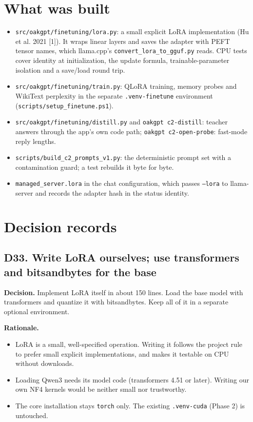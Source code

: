 \documentclass[11pt,a4paper]{article}
\newcommand{\code}[1]{\texttt{#1}}
\begin{document}
\section{What was built}

\begin{itemize}
\item \code{src/oakgpt/finetuning/lora.py}: a small explicit LoRA implementation (Hu et al. 2021 [1]). It wraps linear layers and saves the adapter with PEFT tensor names, which llama.cpp's \code{convert\_lora\_to\_gguf.py} reads. CPU tests cover identity at initialization, the update formula, trainable-parameter isolation and a save/load round trip.
\item \code{src/oakgpt/finetuning/train.py}: QLoRA training, memory probes and WikiText perplexity in the separate \code{.venv-finetune} environment (\code{scripts/setup\_finetune.ps1}).
\item \code{src/oakgpt/finetuning/distill.py} and \code{oakgpt c2-distill}: teacher answers through the app's own code path; \code{oakgpt c2-open-probe}: fast-mode reply lengths.
\item \code{scripts/build\_c2\_prompts\_v1.py}: the deterministic prompt set with a contamination guard; a test rebuilds it byte for byte.
\item \code{managed\_server.lora} in the chat configuration, which passes \code{--lora} to llama-server and records the adapter hash in the status identity.
\end{itemize}

\section{Decision records}

\subsection{D33. Write LoRA ourselves; use transformers and bitsandbytes for the base}

\textbf{Decision.} Implement LoRA itself in about 150 lines. Load the base model with transformers and quantize it with bitsandbytes. Keep all of it in a separate optional environment.

\textbf{Rationale.}

\begin{itemize}
\item LoRA is a small, well-specified operation. Writing it follows the project rule to prefer small explicit implementations, and makes it testable on CPU without downloads.
\item Loading Qwen3 needs its model code (transformers 4.51 or later). Writing our own NF4 kernels would be neither small nor trustworthy.
\item The core installation stays \code{torch} only. The existing \code{.venv-cuda} (Phase 2) is untouched.
\end{itemize}
\end{document}
